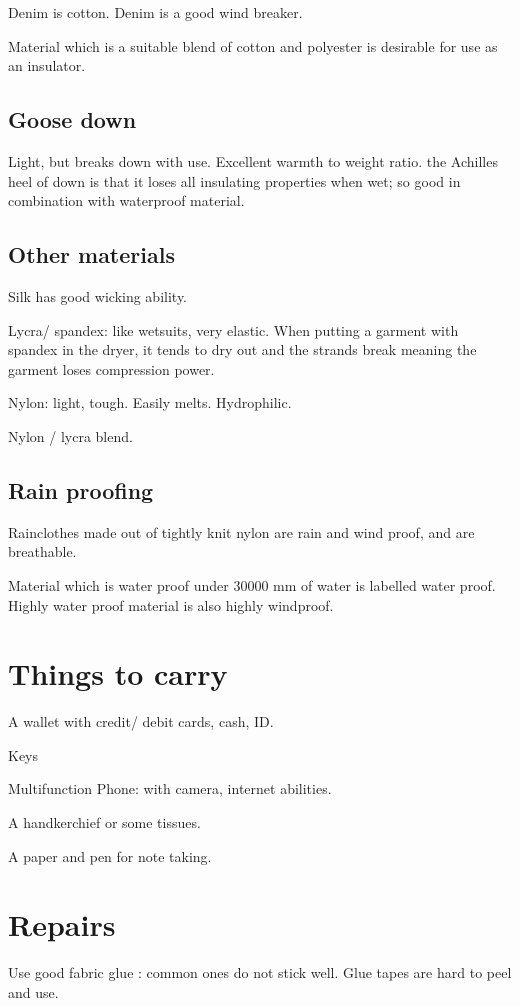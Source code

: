\documentclass[oneside, article]{memoir}
\begin{document}
Denim is cotton. Denim is a good wind breaker.

Material which is a suitable blend of cotton and polyester is desirable for use as an insulator.

\subsection{Goose down}
Light, but breaks down with use. Excellent warmth to weight ratio. the Achilles heel of down is that it loses all insulating properties when wet; so good in combination with waterproof material.

\subsection{Other materials}
Silk has good wicking ability.

Lycra/ spandex: like wetsuits, very elastic. When putting a garment with spandex in the dryer, it tends to dry out and the strands break meaning the garment loses compression power.

Nylon: light, tough. Easily melts. Hydrophilic.

Nylon / lycra blend.

\subsection{Rain proofing}
Rainclothes made out of tightly knit nylon are rain and wind proof, and are breathable.

Material which is water proof under 30000 mm of water is labelled water proof. Highly water proof material is also highly windproof.

\section{Things to carry}

A wallet with credit/ debit cards, cash, ID.

Keys

Multifunction Phone: with camera, internet abilities.

A handkerchief or some tissues.

A paper and pen for note taking.

\section{Repairs}
Use good fabric glue : common ones do not stick well. Glue tapes are hard to peel and use.
\end{document}
